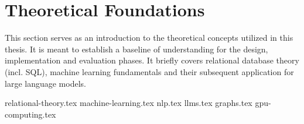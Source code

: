 \section{Theoretical Foundations}

This section serves as an introduction to the theoretical concepts utilized in this thesis. It is meant to establish a
baseline of understanding for the design, implementation and evaluation phases. It briefly covers relational database theory
(incl. SQL), machine learning fundamentals and their subsequent application for large language models.

{relational-theory.tex}
{machine-learning.tex}
{nlp.tex}
{llms.tex}
{graphs.tex}
{gpu-computing.tex}















